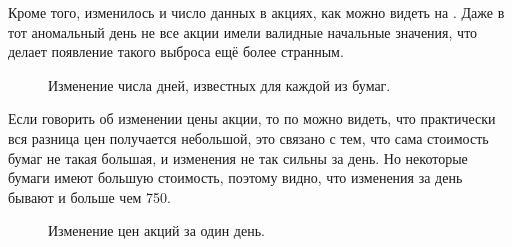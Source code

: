 \documentclass[12pt, a4paper]{article}
\begin{document}
Кроме того, изменилось и число данных в акциях, как можно видеть на . Даже в тот аномальный день не все акции имели валидные начальные значения, что делает появление такого выброса ещё более странным.
\begin{figure}[!h]
\caption{Изменение числа дней, известных для каждой из бумаг.}
\label{fig:row_count_change}
\end{figure}

Если говорить об изменении цены акции, то по  можно видеть, что практически вся разница цен получается небольшой, это связано с тем, что сама стоимость бумаг не такая большая, и изменения не так сильны за день. Но некоторые бумаги имеют большую стоимость, поэтому видно, что изменения за день бывают и больше чем 750.
\begin{figure}[H]
\caption{Изменение цен акций за один день.}
\label{fig:day_cost_change}
\end{figure}
\end{document}
